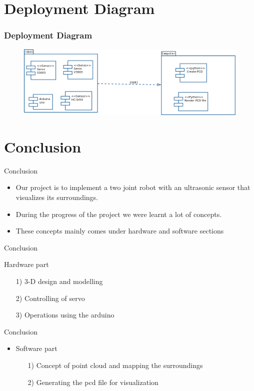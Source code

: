 \documentclass{beamer}
\begin{document}
\section{Deployment Diagram}
\begin{frame}
\frametitle{Deployment Diagram}
\begin{figure}
\includegraphics[scale=0.23]{deployment_digaram.png}
\end{figure}

\end{frame}


\section{Conclusion}
\begin{frame}{Conclusion}
\begin{itemize}
    \item Our project is to implement a two joint robot with an ultrasonic sensor that visualizes its surroundings.
    \item During the progress of the project we were learnt a lot of concepts.
    \item These concepts mainly comes under hardware and software sections 
    
\end{itemize}
\end{frame}
\begin{frame}{Conclusion}
   \item Hardware part
   \begin{itemize}
       \item[1)]3-D design and modelling
       \item[2)]Controlling of servo 
       \item[3)]Operations using the arduino
   \end{itemize}
\end{frame}
\begin{frame}{Conclusion}
    \begin{itemize}
        \item Software part
        \begin{itemize}
            \item[1)]Concept of point cloud and mapping the surroundings
            \item[2)]Generating the pcd file for visualization
        \end{itemize}
    \end{itemize}
\end{frame}
\end{document}
